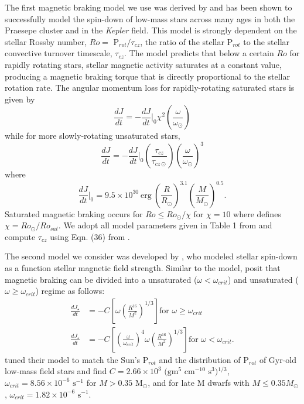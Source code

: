 \documentclass[twocolumn]{aastex61}
\newcommand{\kepler}[0]{\textit{Kepler}\xspace}
\begin{document}
The first magnetic braking model we use was derived by \citet{Matt2015} and has been shown to successfully model the spin-down of low-mass stars across many ages in both the Praesepe cluster and in the \kepler field. This model is strongly dependent on the stellar Rossby number, $Ro = $ P$_{rot}/\tau_{cz}$, the ratio of the stellar P$_{rot}$ to the stellar convective turnover timescale, $\tau_{cz}$. The \citet{Matt2015} model predicts that below a certain $Ro$ for rapidly rotating stars, stellar magnetic activity saturates at a constant value, producing a magnetic braking torque that is directly proportional to the stellar rotation rate.  The angular momentum loss for rapidly-rotating saturated stars is given by
\begin{equation} \label{eqn:mattSat}
\frac{dJ}{dt} = -\frac{dJ}{dt}\Bigg|_0 \chi^2 \left( \frac{\omega}{\omega_{\odot}} \right) 
\end{equation}
while for more slowly-rotating unsaturated stars,
\begin{equation} \label{eqn:mattUnSat}
\frac{dJ}{dt} = -\frac{dJ}{dt}\Bigg|_0 \left( \frac{\tau_{cz}}{\tau_{cz \odot}} \right) \left( \frac{\omega}{\omega_{\odot}} \right)^3 
\end{equation}
where
\begin{equation} \label{eqn:matt0}
\frac{dJ}{dt}\Bigg|_0 = 9.5 \times 10^{30} \ \mathrm{erg} \ \left( \frac{R}{R_{\odot}} \right)^{3.1} \left( \frac{M}{M_{\odot}} \right)^{0.5}.
\end{equation}
Saturated magnetic braking occurs for $Ro \leq Ro_{\odot}/\chi$ for $\chi = 10$ where \citet{Matt2015} defines $\chi = Ro_{\odot}/Ro_{sat}$.  We adopt all model parameters given in Table 1 from \citet{Matt2015} and compute $\tau_{cz}$ using Eqn. (36) from \citet{Cranmer2011}.

The second model we consider was developed by \citet{Reiners2012}, who modeled stellar spin-down as a function stellar magnetic field strength.  Similar to the \citet{Matt2015} model, \citet{Reiners2012} posit that magnetic braking can be divided into a unsaturated ($\omega < \omega_{crit}$) and unsaturated ($\omega \geq \omega_{crit}$) regime as follows:
\begin{equation} \label{eqn:reiners}
\begin{split}
\frac{dJ_{\star}}{dt} & = -C \left[ \omega \left(\frac{R^{16}}{M^2} \right)^{1/3} \right] \text{for $\omega \geq \omega_{crit}$} \\
\frac{dJ_{\star}}{dt} & = -C \left[ \left( \frac{\omega}{\omega_{crit}} \right)^4 \omega \left(\frac{R^{16}}{M^2} \right)^{1/3} \right] \text{for $\omega < \omega_{crit}$}.
\end{split}
\end{equation}
\citet{Reiners2012} tuned their model to match the Sun's P$_{rot}$ and the distribution of P$_{rot}$ of Gyr-old low-mass field stars and find $C = 2.66 \times 10^3 \text{ (gm$^5$ cm$^{-10}$ s$^3$)$^{1/3}$}$, $\omega_{crit} = 8.56 \times 10^{-6}\text{ s$^{-1}$}$ for $M > 0.35$ M$_{\odot}$, and for late M dwarfs with $M \leq 0.35 M_{\odot}$, $\omega_{crit} = 1.82 \times 10^{-6} \text{ s$^{-1}$}$.
\end{document}
